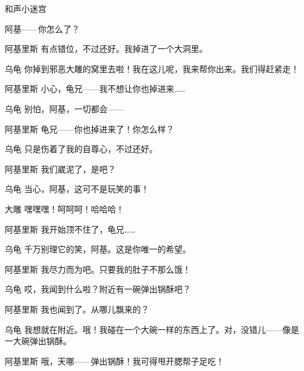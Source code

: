 \begin{dialog}{和声小迷宫}
\begin{dialogue}
\begin{dialogue}
\begin{dialogue}
\begin{dialogue}
      阿基——你怎么了？

      \item[阿基里斯]有点错位，不过还好。我掉进了一个大洞里。

      \item[乌龟]你掉到邪恶大雕的窝里去啦！我在这儿呢，我来帮你出来。我们得赶紧走！

      \item[阿基里斯]小心，龟兄——我不想让你也掉进来……

      \item[乌龟]别怕，阿基，一切都会——


      \item[阿基里斯]龟兄——你也掉进来了！你怎么样？

      \item[乌龟]只是伤着了我的自尊心，不过还好。

      \item[阿基里斯]我们崴泥了，是吧？


      \item[乌龟]当心，阿基，这可不是玩笑的事！

      \item[大雕]嘿嘿嘿！呵呵呵！哈哈哈！

      \item[阿基里斯]我开始顶不住了，龟兄……

      \item[乌龟]千万别理它的笑，阿基。这是你唯一的希望。

      \item[阿基里斯]我尽力而为吧。只要我的肚子不那么饿！

      \item[乌龟]哎，我闻到什么啦？附近有一碗弹出锅酥吧？

      \item[阿基里斯]我也闻到了。从哪儿飘来的？

      \item[乌龟]我想就在附近。哦！我碰在一个大碗一样的东西上了。对，没错儿——像是一大碗弹出锅酥。

      \item[阿基里斯]哦，天哪——弹出锅酥！我可得甩开腮帮子足吃！
    \end{dialogue}
  \end{dialogue}
\end{dialogue}


\end{dialogue}
\end{dialog}
